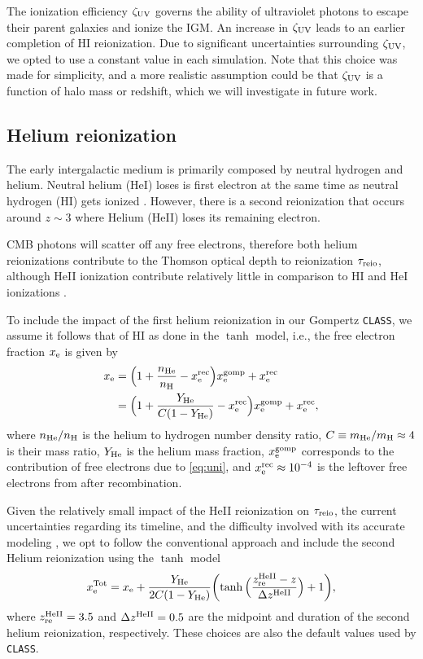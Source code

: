 The ionization efficiency $\zeta_\mathrm{UV}$ governs the ability of ultraviolet
photons to escape their parent galaxies and ionize the IGM. An increase
in $\zeta_\mathrm{UV}$ leads to an earlier completion of HI reionization.
Due to significant uncertainties surrounding $\zeta_\mathrm{UV}$, we opted to use
a constant value in each simulation.
Note that this choice was made for simplicity, and a more realistic
assumption could be that $\zeta_\mathrm{UV}$ is a function of halo mass
\cite{Park2019} or redshift, which we will investigate in future
work.


\subsection*{Helium reionization}
\label{ssec:helium}

The early intergalactic medium is primarily composed by neutral hydrogen
and helium.
Neutral helium (HeI) loses is first electron at the same time as neutral
hydrogen (HI) gets ionized \cite{Trac2007}.
However, there is a second reionization that occurs around $z\sim3$
where Helium (HeII) loses its remaining electron.

CMB photons will scatter off any free electrons, therefore both helium
reionizations contribute to the Thomson optical depth to reionization
$\tau_{\mathrm{reio}}$, although HeII ionization contribute relatively little in
comparison to HI and HeI ionizations \cite{Liu2016}.

To include the impact of the first helium reionization in our Gompertz
\texttt{CLASS}, we assume it follows that of HI as done in the $\tanh$
model, i.e., the free electron fraction $x_{\mathrm{e}}$ is given by
%
\begin{align}
\label{eq:xe_H_He}
x_\e
&= \Bigl(1 + \frac{n_\He}{n_\mathrm{H}} - x^\rec_\e\Bigr) x_\e^\gomp
  + x^\rec_\e
\nonumber\\
%
&= \Bigl(1 + \frac{Y_\He}{C (1 - Y_\He)} - x^\rec_\e\Bigr) x_\e^\gomp
  + x^\rec_\e,
\end{align}
%
where $n_{\mathrm{He}} / n_\mathrm{H}$ is the helium to hydrogen number density
ratio, $C \equiv m_{\mathrm{He}} / m_\mathrm{H} \approx 4$ is their mass ratio,
$Y_{\mathrm{He}}$ is the helium mass fraction, $x_{\mathrm{e}}^{\mathrm{gomp}}$ corresponds to the
contribution of free electrons due to \cref{eq:uni}, and $x^{\mathrm{rec}}_{\mathrm{e}}
\approx 10^{-4}$ is the leftover free electrons from after
recombination.

Given the relatively small impact of the HeII reionization on
$\tau_{\mathrm{reio}}$, the current uncertainties regarding its timeline, and the
difficulty involved with its accurate modeling \cite{Hotinli2023,
Upton2020}, we opt to follow the conventional approach and include the
second Helium reionization using the $\tanh$ model
%
\begin{equation}
\label{eq:xe_tot}
x_{\mathrm{e}}^\mathrm{Tot} = x_{\mathrm{e}} + \frac{Y_{\mathrm{He}}}{2C(1 - Y_{\mathrm{He}})}
  \biggl(\tanh{\Bigl(\frac{z_{\mathrm{re}}^{\mathrm{HeII}}- z}{\Delta z^{\mathrm{HeII}}}\Bigr)} + 1\biggr),
\end{equation}
%
where $z_{\mathrm{re}}^{\mathrm{HeII}} = 3.5$ and $\Delta z^{\mathrm{HeII}} = 0.5$ are the midpoint
and duration of the second helium reionization, respectively.
These choices are also the default values used by \texttt{CLASS}.


